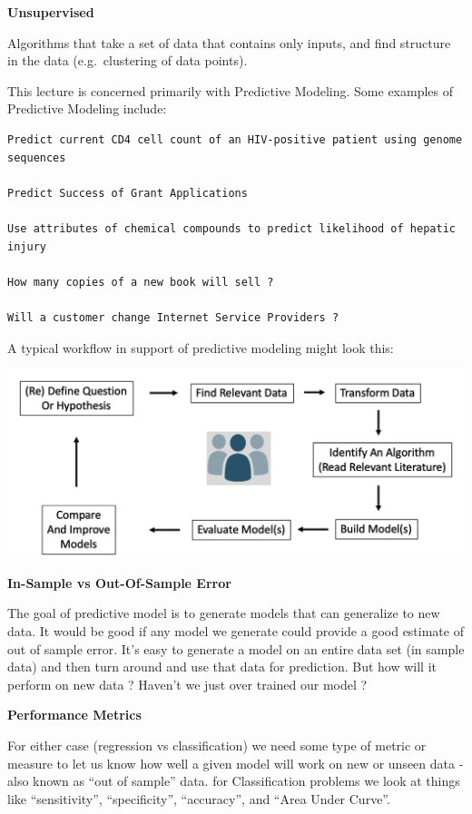 \documentclass[
]{article}
\begin{document}
\textbf{Unsupervised}

Algorithms that take a set of data that contains only inputs, and find
structure in the data (e.g.~clustering of data points).

This lecture is concerned primarily with Predictive Modeling. Some
examples of Predictive Modeling include:

\begin{verbatim}
Predict current CD4 cell count of an HIV-positive patient using genome sequences

Predict Success of Grant Applications

Use attributes of chemical compounds to predict likelihood of hepatic injury

How many copies of a new book will sell ?

Will a customer change Internet Service Providers ?
\end{verbatim}

A typical workflow in support of predictive modeling might look this:

\includegraphics{./IMG/worfflow.png}

\textbf{In-Sample vs Out-Of-Sample Error}

The goal of predictive model is to generate models that can generalize
to new data. It would be good if any model we generate could provide a
good estimate of out of sample error. It's easy to generate a model on
an entire data set (in sample data) and then turn around and use that
data for prediction. But how will it perform on new data ? Haven't we
just over trained our model ?

\textbf{Performance Metrics}

For either case (regression vs classification) we need some type of
metric or measure to let us know how well a given model will work on new
or unseen data - also known as ``out of sample'' data. for
Classification problems we look at things like ``sensitivity'',
``specificity'', ``accuracy'', and ``Area Under Curve''.
\end{document}
